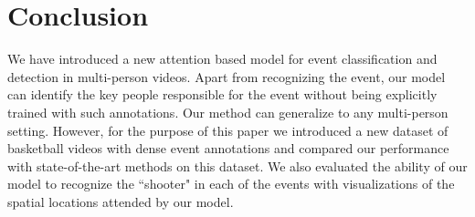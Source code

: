 \section{Conclusion}
We have introduced a new attention based model for event classification and
detection in multi-person videos. Apart from recognizing the event, our model
can identify the key people responsible for the event without being explicitly
trained with such annotations. Our method can generalize to any
multi-person setting. However, for the purpose of this paper we introduced a
new dataset of basketball videos with dense event annotations and compared our
performance with state-of-the-art methods on this dataset.  We also evaluated
the ability of our model to recognize the ``shooter" in each of the events with
visualizations of the spatial locations attended by our model.
